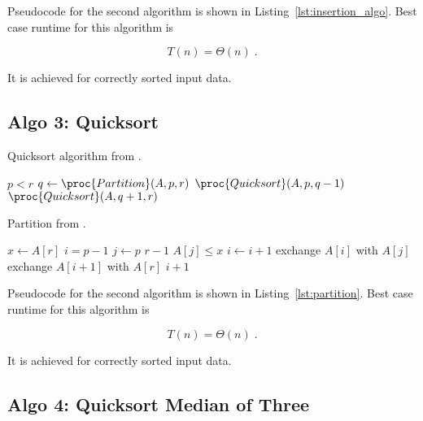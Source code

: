\documentclass[twocolumn, sigconf, nonacm, natbib, screen, balance=False]{acmart}
\begin{document}
Pseudocode for the second algorithm is shown in
Listing~\ref{lst:insertion_algo}. Best case runtime for this algorithm
is

\begin{equation}
  T(n) = \Theta(n) \;.  \label{eq:ins_sort_best}
\end{equation}

It is achieved for correctly sorted input data.

\subsection{Algo 3: Quicksort}\label{sec:algo3}

\begin{listing}
  \caption{Quicksort algorithm from \citet[Ch.~2.1]{CLRS_2009}.}
  \label{lst:quicksort_algo}
  \begin{codebox}
    \li \If $p < r$
    \li \Then $q \gets \proc{Partition}(A, p, r)$
    \li     $\proc{Quicksort}(A, p, q - 1)$
    \li     $\proc{Quicksort}(A, q + 1, r)$
    \End
  \end{codebox}
\end{listing}

\begin{listing}
  \caption{Partition from \citet[Ch.~2.1]{CLRS_2009}.}
  \label{lst:partition}
  \begin{codebox}
    \li $x \gets A[r]$
    \li $i = p - 1$
    \li \For $j \gets p$ \To $r - 1$
    \li \Do \If $A[j] \le x$
    \li  	\Then $i \gets i + 1$
    \li     exchange $A[i]$ with $A[j]$
    \End
    \End
    \li exchange $A[i + 1]$ with $A[r]$
    \li \Return $i + 1$
  \end{codebox}
\end{listing}

Pseudocode for the second algorithm is shown in
Listing~\ref{lst:partition}. Best case runtime for this algorithm
is

\begin{equation}
  T(n) = \Theta(n) \;.  \label{eq:ins_sort_best}
\end{equation}

It is achieved for correctly sorted input data.

\subsection{Algo 4: Quicksort Median of Three}\label{sec:algo4}
\end{document}
